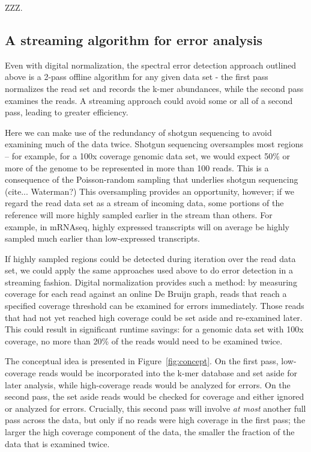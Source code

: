 \documentclass{article}
\begin{document}
ZZZ.

\subsection{A streaming algorithm for error analysis}

Even with digital normalization, the spectral error detection approach
outlined above is a 2-pass offline algorithm for any given data set -
the first pass normalizes the read set and records the k-mer
abundances, while the second pass examines the reads.  A streaming
approach could avoid some or all of a second pass, leading to
greater efficiency.

Here we can make use of the redundancy of shotgun sequencing to avoid
examining much of the data twice. Shotgun
sequencing oversamples most regions -- for example, for a 100x
coverage genomic data set, we would expect 50\% or more of the genome
to be represented in more than 100 reads.  This is a consequence of
the Poisson-random sampling that underlies shotgun sequencing
(cite... Waterman?)  This oversampling provides an opportunity,
however; if we regard the read data set as a stream of incoming data,
some portions of the reference will more highly sampled earlier in the
stream than others.  For example, in mRNAseq, highly expressed
transcripts will on average be highly sampled much earlier than
low-expressed transcripts.

If highly sampled regions could be detected during iteration over the
read data set, we could apply the same approaches used above to do
error detection in a streaming fashion.  Digital normalization
provides such a method: by measuring coverage for each read against an
online De Bruijn graph, reads that reach a specified coverage
threshold can be examined for errors immediately.  Those reads that
had not yet reached high coverage could be set aside and re-examined
later.  This could result in significant runtime savings: for a
genomic data set with 100x coverage, no more than 20\% of the reads
would need to be examined twice.

The conceptual idea is presented in Figure~\ref{fig:concept}.  On the
first pass, low-coverage reads would be incorporated into the k-mer
database and set aside for later analysis, while high-coverage reads
would be analyzed for errors. On the second pass, the set aside reads
would be checked for coverage and either ignored or analyzed for
errors.  Crucially, this second pass will involve {\em at most}
another full pass across the data, but only if no reads were high
coverage in the first pass; the larger the high coverage component
of the data, the smaller the fraction of the data that is examined twice.
\end{document}
